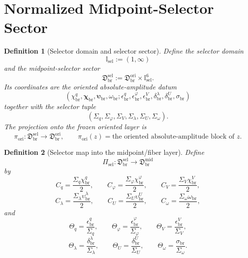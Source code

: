 \documentclass[11pt]{article}
\newcommand{\OriginSector}{\mathfrak D_{\mathrm{br}}^{\mathrm{ori}}}
\newcommand{\AbsReadAmp}{\chi_{\mathrm{br}}^{q}}
\newcommand{\AbsCovAmp}{\chi_{\mathrm{br}}^{\varphi}}
\newcommand{\AbsRelaxAmp}{\chi_{\mathrm{br}}^{V}}
\newcommand{\AbsKinAmp}{\bm\chi_{\mathrm{br}}}
\newcommand{\AbsWellAmp}{\upsilon_{\mathrm{br}}^{\lambda}}
\newcommand{\AbsEqAmp}{\upsilon_{\mathrm{br}}^{U}}
\newcommand{\AbsAnchorAmp}{\bm\upsilon_{\mathrm{br}}}
\newcommand{\AbsScaleAmp}{\omega_{\mathrm{br}}}
\newcommand{\PolRead}{\epsilon_{\mathrm{br}}^{q}}
\newcommand{\PolCov}{\epsilon_{\mathrm{br}}^{\varphi}}
\newcommand{\PolRelax}{\epsilon_{\mathrm{br}}^{V}}
\newcommand{\PolWell}{\delta_{\mathrm{br}}^{\lambda}}
\newcommand{\PolEq}{\delta_{\mathrm{br}}^{U}}
\newcommand{\PolScale}{\sigma_{\mathrm{br}}}
\newcommand{\MidFiberSector}{\mathfrak D_{\mathrm{br}}^{\mathrm{mid}}}
\newcommand{\MidRead}{C_{q}}
\newcommand{\MidCov}{C_{\varphi}}
\newcommand{\MidRelax}{C_{V}}
\newcommand{\MidWell}{C_{\lambda}}
\newcommand{\MidEq}{C_{U}}
\newcommand{\MidScale}{C_{\omega}}
\newcommand{\FiberRead}{\Theta_{q}}
\newcommand{\FiberCov}{\Theta_{\varphi}}
\newcommand{\FiberRelax}{\Theta_{V}}
\newcommand{\FiberWell}{\Theta_{\lambda}}
\newcommand{\FiberEq}{\Theta_{U}}
\newcommand{\FiberScale}{\Theta_{\omega}}
\newcommand{\MidSelSector}{\mathfrak D_{\mathrm{br}}^{\mathrm{sel}}}
\newcommand{\MidSelMap}{\Pi_{\mathrm{sel}}}
\newcommand{\SelProj}{\pi_{\mathrm{ori}}}
\newcommand{\SelDom}{\mathbb I_{\mathrm{sel}}}
\newcommand{\SelRead}{\Sigma_{q}}
\newcommand{\SelCov}{\Sigma_{\varphi}}
\newcommand{\SelRelax}{\Sigma_{V}}
\newcommand{\SelWell}{\Sigma_{\lambda}}
\newcommand{\SelEq}{\Sigma_{U}}
\newcommand{\SelScale}{\Sigma_{\omega}}
\newtheorem{definition}{Definition}
\begin{document}
\section{Normalized Midpoint-Selector Sector}

\begin{definition}[Selector domain and selector sector]
\label{def:selectorsector}
Define the selector domain
\begin{equation}
\SelDom:=(1,\infty)
\label{eq:seldom}
\end{equation}
and the midpoint-selector sector
\begin{equation}
\MidSelSector
:=
\OriginSector\times\SelDom^{6}.
\label{eq:selsector}
\end{equation}
Its coordinates are the oriented absolute-amplitude datum
\begin{equation}
(\AbsReadAmp,\AbsKinAmp,\AbsAnchorAmp,\AbsScaleAmp;\PolRead,\PolCov,\PolRelax,\PolWell,\PolEq,\PolScale)
\label{eq:selorigincoords}
\end{equation}
together with the selector tuple
\begin{equation}
(\SelRead,\SelCov,\SelRelax,\SelWell,\SelEq,\SelScale).
\label{eq:selcoords}
\end{equation}
The projection onto the frozen oriented layer is
\begin{equation}
\SelProj:\MidSelSector\longrightarrow\OriginSector,
\qquad
\SelProj(z)=\text{the oriented absolute-amplitude block of }z.
\label{eq:selproj}
\end{equation}
\end{definition}

\begin{definition}[Selector map into the midpoint/fiber layer]
\label{def:selmap}
Define
\begin{equation}
\MidSelMap:\MidSelSector\longrightarrow\MidFiberSector
\label{eq:selmap}
\end{equation}
by
\begin{equation}
\MidRead=\frac{\SelRead\AbsReadAmp}{2},
\qquad
\MidCov=\frac{\SelCov\AbsCovAmp}{2},
\qquad
\MidRelax=\frac{\SelRelax\AbsRelaxAmp}{2},
\label{eq:selmidA}
\end{equation}
\begin{equation}
\MidWell=\frac{\SelWell\AbsWellAmp}{2},
\qquad
\MidEq=\frac{\SelEq\AbsEqAmp}{2},
\qquad
\MidScale=\frac{\SelScale\AbsScaleAmp}{2},
\label{eq:selmidB}
\end{equation}
and
\begin{equation}
\FiberRead=\frac{\PolRead}{\SelRead},
\qquad
\FiberCov=\frac{\PolCov}{\SelCov},
\qquad
\FiberRelax=\frac{\PolRelax}{\SelRelax},
\label{eq:selfiberA}
\end{equation}
\begin{equation}
\FiberWell=\frac{\PolWell}{\SelWell},
\qquad
\FiberEq=\frac{\PolEq}{\SelEq},
\qquad
\FiberScale=\frac{\PolScale}{\SelScale}.
\label{eq:selfiberB}
\end{equation}
\end{definition}
\end{document}
